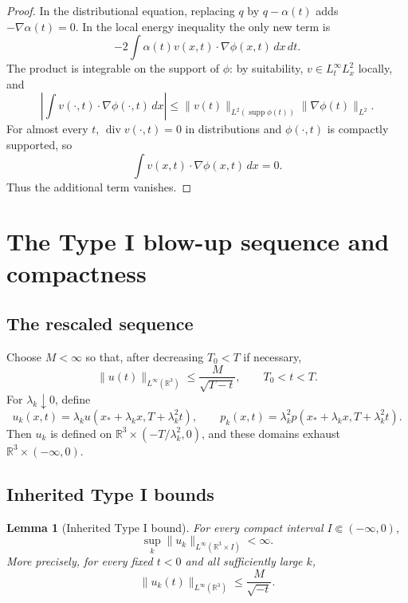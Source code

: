 \documentclass[11pt]{amsart}
\theoremstyle{plain}
\newtheorem{lemma}[theorem]{Lemma}
\theoremstyle{definition}
\theoremstyle{remark}
\numberwithin{equation}{section}
\newcommand{\R}{\mathbb R}
\newcommand{\supp}{\operatorname{supp}}
\newcommand{\divergence}{\operatorname{div}}
\begin{document}
\begin{proof}
In the distributional equation, replacing \(q\) by \(q-\alpha(t)\) adds
\(-\nabla\alpha(t)=0\).  In the local energy inequality the only new term is
\[
   -2\int \alpha(t)v(x,t)\cdot\nabla\phi(x,t)\,dx\,dt .
\]
The product is integrable on the support of \(\phi\): by suitability,
\(v\in L^\infty_tL^2_x\) locally, and
\[
   \left|\int v(\cdot,t)\cdot\nabla\phi(\cdot,t)\,dx\right|
   \le
   \|v(t)\|_{L^2(\supp\phi(t))}
   \|\nabla\phi(t)\|_{L^2}.
\]
For almost every \(t\), \(\divergence v(\cdot,t)=0\) in distributions and
\(\phi(\cdot,t)\) is compactly supported, so
\[
   \int v(x,t)\cdot\nabla\phi(x,t)\,dx=0 .
\]
Thus the additional term vanishes.
\end{proof}

\section{The Type I blow-up sequence and compactness}
\label{sec:blowup-compactness}

\subsection{The rescaled sequence}

Choose \(M<\infty\) so that, after decreasing \(T_0<T\) if necessary,
\begin{equation}\label{eq:type-I-pointwise}
   \|u(t)\|_{L^\infty(\R^3)}
   \le \frac{M}{\sqrt{T-t}},
   \qquad T_0<t<T.
\end{equation}
For \(\lambda_k\downarrow0\), define
\begin{equation}\label{eq:rescaled-sequence}
   u_k(x,t)=\lambda_k u(x_*+\lambda_k x,T+\lambda_k^2t),
   \qquad
   p_k(x,t)=\lambda_k^2p(x_*+\lambda_k x,T+\lambda_k^2t).
\end{equation}
Then \(u_k\) is defined on \(\R^3\times(-T/\lambda_k^2,0)\), and these
domains exhaust \(\R^3\times(-\infty,0)\).

\subsection{Inherited Type I bounds}

\begin{lemma}[Inherited Type I bound]\label{lem:inherited-bound}
For every compact interval \(I\Subset(-\infty,0)\),
\[
   \sup_k\|u_k\|_{L^\infty(\R^3\times I)}<\infty.
\]
More precisely, for every fixed \(t<0\) and all sufficiently large \(k\),
\[
   \|u_k(t)\|_{L^\infty(\R^3)}
   \le \frac{M}{\sqrt{-t}}.
\]
\end{lemma}
\end{document}
